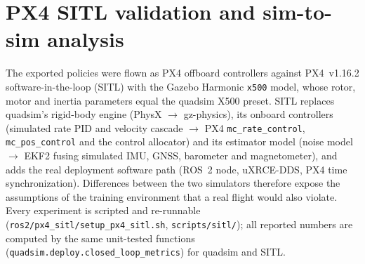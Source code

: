 \section{PX4 SITL validation and sim-to-sim analysis}\label{sec:sitl}
The exported policies were flown as PX4 offboard controllers against PX4~v1.16.2 software-in-the-loop (SITL) with the
Gazebo Harmonic \texttt{x500} model, whose rotor, motor and inertia parameters equal the quadsim X500 preset. SITL
replaces quadsim's rigid-body engine (PhysX $\to$ gz-physics), its onboard controllers (simulated rate PID and velocity
cascade $\to$ PX4 \texttt{mc\_rate\_control}, \texttt{mc\_pos\_control} and the control allocator) and its estimator model
(noise model $\to$ EKF2 fusing simulated IMU, GNSS, barometer and magnetometer), and adds the real deployment software
path (ROS~2 node, uXRCE-DDS, PX4 time synchronization). Differences between the two simulators therefore expose the
assumptions of the training environment that a real flight would also violate. Every experiment is scripted and
re-runnable (\texttt{ros2/px4\_sitl/setup\_px4\_sitl.sh}, \texttt{scripts/sitl/}); all reported numbers are computed by
the same unit-tested functions (\texttt{quadsim.deploy.closed\_loop\_metrics}) for quadsim and SITL.

